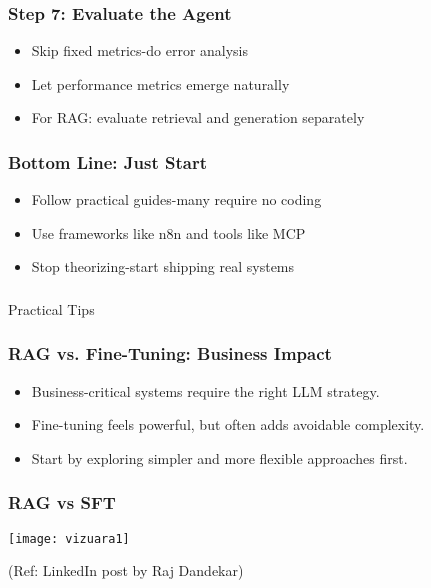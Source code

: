 \begin{frame}[fragile]\frametitle{Step 7: Evaluate the Agent}
      \begin{itemize}
        \item Skip fixed metrics-do error analysis
        \item Let performance metrics emerge naturally
        \item For RAG: evaluate retrieval and generation separately
      \end{itemize}
\end{frame}

\begin{frame}[fragile]\frametitle{Bottom Line: Just Start}
      \begin{itemize}
        \item Follow practical guides-many require no coding
        \item Use frameworks like n8n and tools like MCP
        \item Stop theorizing-start shipping real systems
      \end{itemize}
\end{frame}


\begin{frame}[fragile]\frametitle{}
\begin{center}
{\Large Practical Tips}
\end{center}
\end{frame}

\begin{frame}[fragile]\frametitle{RAG vs. Fine-Tuning: Business Impact}
    \begin{itemize}
        \item Business-critical systems require the right LLM strategy.
        \item Fine-tuning feels powerful, but often adds avoidable complexity.
        \item Start by exploring simpler and more flexible approaches first.
    \end{itemize}
\end{frame}

\begin{frame}[fragile]\frametitle{RAG vs SFT}
	
	\begin{center}
	\texttt{[image: vizuara1]}
	\end{center}
	
{\tiny (Ref: LinkedIn post by Raj Dandekar)}

\end{frame}


